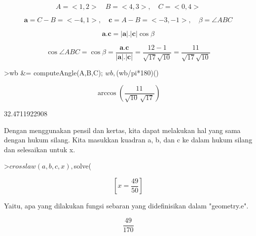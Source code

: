 \documentclass[a4paper,10pt]{article}
\begin{document}
\begin{eulernotebook}
\begin{eulercomment}
\begin{eulercomment}
\begin{eulercomment}
\begin{eulercomment}
\begin{eulercomment}
\begin{eulercomment}
\begin{eulercomment}
\begin{eulercomment}
\begin{eulercomment}
\begin{eulercomment}
\begin{eulercomment}
\begin{eulercomment}
\begin{eulercomment}
\begin{eulercomment}
\begin{eulercomment}
\begin{eulercomment}
\begin{eulercomment}
\begin{eulercomment}
\begin{eulercomment}
\end{eulercomment}
\begin{eulerformula}
\[
A=<1,2>\quad B=<4,3>,\quad C=<0,4>
\]
\end{eulerformula}
\begin{eulerformula}
\[
\mathbf{a}=C-B=<-4,1>,\quad \mathbf{c}=A-B=<-3,-1>,\quad \beta=\angle ABC
\]
\end{eulerformula}
\begin{eulerformula}
\[
\mathbf{a}.\mathbf{c}=|\mathbf{a}|.|\mathbf{c}|\cos \beta
\]
\end{eulerformula}
\begin{eulerformula}
\[
\cos \angle ABC =\cos\beta=\frac{\mathbf{a}.\mathbf{c}}{|\mathbf{a}|.|\mathbf{c}|}=\frac{12-1}{\sqrt{17}\sqrt{10}}=\frac{11}{\sqrt{17}\sqrt{10}}
\]
\end{eulerformula}
\begin{eulerprompt}
>wb &= computeAngle(A,B,C); $wb, $(wb/pi*180)()
\end{eulerprompt}
\begin{eulerformula}
\[
\arccos \left(\frac{11}{\sqrt{10}\,\sqrt{17}}\right)
\]
\end{eulerformula}
\begin{euleroutput}
  32.4711922908
\end{euleroutput}
\begin{eulercomment}
Dengan menggunakan pensil dan kertas, kita dapat melakukan hal yang
sama dengan hukum silang. Kita masukkan kuadran a, b, dan c ke dalam
hukum silang dan selesaikan untuk x.
\end{eulercomment}
\begin{eulerprompt}
>$crosslaw(a,b,c,x), $solve(%
\end{eulerprompt}
\begin{eulerformula}
\[
\left[ x=\frac{49}{50} \right] 
\]
\end{eulerformula}
\begin{eulercomment}
Yaitu, apa yang dilakukan fungsi sebaran yang didefinisikan dalam
"geometry.e".
\end{eulercomment}
\begin{eulerformula}
\[
\frac{49}{170}
\]
\end{eulerformula}
\begin{eulercomment}

\end{eulercomment}
\end{eulercomment}
\end{eulercomment}
\end{eulercomment}
\end{eulercomment}
\end{eulercomment}
\end{eulercomment}
\end{eulercomment}
\end{eulercomment}
\end{eulercomment}
\end{eulercomment}
\end{eulercomment}
\end{eulercomment}
\end{eulercomment}
\end{eulercomment}
\end{eulercomment}
\end{eulercomment}
\end{eulercomment}
\end{eulercomment}
\end{eulernotebook}
\end{document}
